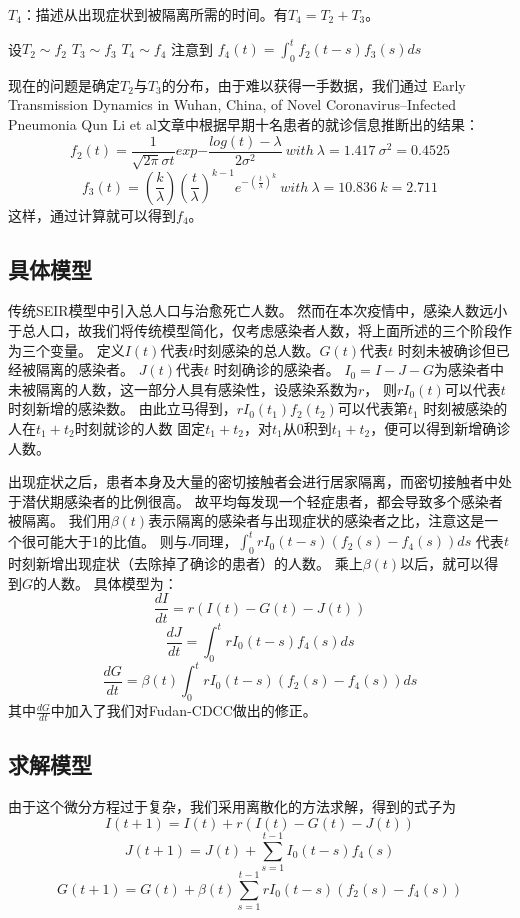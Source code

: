 \documentclass[UTF8]{ctexart}
\begin{document}
				$T_4$：描述从出现症状到被隔离所需的时间。有$T_4=T_2+T_3$。
				
				设$T_2 \sim f_2$ $T_3 \sim f_3$ $T_4 \sim f_4$
				注意到 $f_4(t)=\int_0^t f_2(t-s)f_3(s)ds$
				
				现在的问题是确定$T_2$与$T_3$的分布，由于难以获得一手数据，我们通过
				Early Transmission Dynamics in Wuhan, China, of Novel Coronavirus–Infected Pneumonia Qun Li et al文章中根据早期十名患者的就诊信息推断出的结果：
				$$f_2(t)=\frac{1}{\sqrt{2\pi} \sigma t} exp{-\frac{log(t)-\lambda}{2 \sigma^2}} \ with\  \lambda=1.417\ \sigma^2=0.4525$$
				$$f_3(t)=(\frac{k}{\lambda})(\frac{t}{\lambda})^{k-1} e^{-(\frac{t}{\lambda})^k}\ with\ \lambda=10.836\ k=2.711$$
				这样，通过计算就可以得到$f_4$。
	
		\subsection{具体模型}
			传统SEIR模型中引入总人口与治愈死亡人数。
			然而在本次疫情中，感染人数远小于总人口，故我们将传统模型简化，仅考虑感染者人数，将上面所述的三个阶段作为三个变量。
			定义$I(t)$代表$t$时刻感染的总人数。$G(t)$代表$t$ 时刻未被确诊但已经被隔离的感染者。 $J(t)$代表$t$ 时刻确诊的感染者。
			$I_0=I-J-G$为感染者中未被隔离的人数，这一部分人具有感染性，设感染系数为$r$，
			则$rI_0(t)$可以代表$t$时刻新增的感染数。
			由此立马得到，$rI_0(t_1)f_2(t_2)$可以代表第$t_1$ 时刻被感染的人在$t_1+t_2$时刻就诊的人数
			固定$t_1+t_2$，对$t_1$从$0$积到$t_1+t_2$，便可以得到新增确诊人数。
			
			出现症状之后，患者本身及大量的密切接触者会进行居家隔离，而密切接触者中处于潜伏期感染者的比例很高。
			故平均每发现一个轻症患者，都会导致多个感染者被隔离。
			我们用$\beta(t)$表示隔离的感染者与出现症状的感染者之比，注意这是一个很可能大于1的比值。
			则与$J$同理，$\int_0^t rI_0(t-s)(f_2(s)-f_4(s)) ds$ 代表$t$时刻新增出现症状（去除掉了确诊的患者）的人数。
			乘上$\beta(t)$以后，就可以得到$G$的人数。
			具体模型为：
			$$\frac{dI}{dt}=r(I(t)-G(t)-J(t))$$
			$$\frac{dJ}{dt}=\int_0^t rI_0(t-s)f_4(s) ds $$
			$$\frac{dG}{dt}=\beta(t)\int_0^t rI_0(t-s)(f_2(s)-f_4(s)) ds $$
			其中$\frac{dG}{dt}$中加入了我们对Fudan-CDCC做出的修正。
	
		\subsection{求解模型}
				由于这个微分方程过于复杂，我们采用离散化的方法求解，得到的式子为
				$$I(t+1)=I(t)+r(I(t)-G(t)-J(t))$$
				$$J(t+1)=J(t)+\sum_{s=1}^{t-1} I_0(t-s)f_4(s) $$
				$$G(t+1)=G(t)+\beta(t) \sum_{s=1}^{t-1} rI_0(t-s)(f_2(s)-f_4(s)) $$
				
\end{document}
